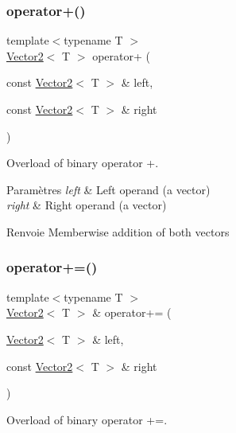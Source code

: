 \subsubsection{\texorpdfstring{operator+()}{operator+()}}
{\footnotesize\ttfamily template$<$typename T $>$ \\
\hyperlink{classsf_1_1Vector2}{Vector2}$<$ T $>$ operator+ (\begin{DoxyParamCaption}\item[{const \hyperlink{classsf_1_1Vector2}{Vector2}$<$ T $>$ \&}]{left,  }\item[{const \hyperlink{classsf_1_1Vector2}{Vector2}$<$ T $>$ \&}]{right }\end{DoxyParamCaption})\hspace{0.3cm}{\ttfamily [related]}}



Overload of binary operator +. 


\begin{DoxyParams}{Paramètres}
{\em left} & Left operand (a vector) \\
\hline
{\em right} & Right operand (a vector)\\
\hline
\end{DoxyParams}
\begin{DoxyReturn}{Renvoie}
Memberwise addition of both vectors 
\end{DoxyReturn}
\mbox{\label{classsf_1_1Vector2_ad4b7a9d355d57790bfc7df0ade8bb628}} 
\subsubsection{\texorpdfstring{operator+=()}{operator+=()}}
{\footnotesize\ttfamily template$<$typename T $>$ \\
\hyperlink{classsf_1_1Vector2}{Vector2}$<$ T $>$ \& operator+= (\begin{DoxyParamCaption}\item[{\hyperlink{classsf_1_1Vector2}{Vector2}$<$ T $>$ \&}]{left,  }\item[{const \hyperlink{classsf_1_1Vector2}{Vector2}$<$ T $>$ \&}]{right }\end{DoxyParamCaption})\hspace{0.3cm}{\ttfamily [related]}}



Overload of binary operator +=. 

